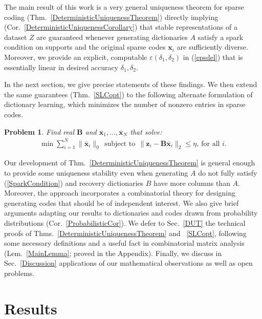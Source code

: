 \documentclass[journal, twocolumn]{IEEEtran}
\newtheorem{problem}{Problem}
\begin{document}
The main result of this work is a very general uniqueness theorem for sparse coding (Thm.~\ref{DeterministicUniquenessTheorem}) directly 
implying (Cor.~\ref{DeterministicUniquenessCorollary}) that stable representations of a dataset $Z$ are guaranteed whenever generating dictionaries $A$ satisfy a spark condition on supports and the original sparse codes $\mathbf{x}_i$ are sufficiently diverse.  Moreover, we provide an explicit, computable $\varepsilon(\delta_1, \delta_2)$ in (\ref{epsdel}) that is essentially linear in desired accuracy $\delta_1, \delta_2$.

In the next section, we give precise statements of these findings.  We then extend the same guarantees (Thm.~\ref{SLCopt}) to the following alternate formulation of dictionary learning, which minimizes the number of nonzero entries in sparse codes.

\begin{problem}\label{OptimizationProblem}
Find real $\mathbf{B}$ and \mbox{$\mathbf{\overline x}_1, \ldots, \mathbf{\overline x}_N$} that solve:
\begin{align}\label{minsum}
\min \sum_{i = 1}^N \|\mathbf{\overline x}_{i}\|_0 \ \
\text{subject to} \ \ \|\mathbf{z}_i - \mathbf{B}\mathbf{\overline x}_i\|_2 \leq \eta, \ \text{for all $i$}.
\end{align}
\end{problem}

Our development of Thm.~\ref{DeterministicUniquenessTheorem} is general enough to provide some uniqueness stability even when generating $A$ do not fully satisfy (\ref{SparkCondition}) and recovery dictionaries $B$ have more columns than $A$.  Moreover, the approach incorporates a combinatorial theory for designing generating codes that should be of independent interest. We also give brief arguments adapting our results to dictionaries and codes drawn from probability distributions (Cor.~\ref{ProbabilisticCor}). We defer to Sec.~\ref{DUT} the technical proofs of Thms.~\ref{DeterministicUniquenessTheorem} and ~\ref{SLCopt}, following some necessary definitions and a useful fact in combinatorial matrix analysis (Lem.~\ref{MainLemma}; proved in the Appendix). Finally, we discuss in Sec.~\ref{Discussion} applications of our mathematical observations as well as open problems. 

\section{Results}\label{Results}
\end{document}
